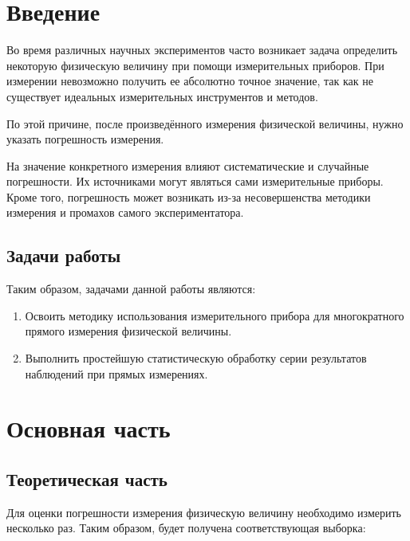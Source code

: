 

\section{Введение}
Во время различных научных экспериментов часто возникает задача определить некоторую физическую величину при помощи измерительных приборов. При измерении  невозможно получить ее абсолютно точное значение, так как не существует идеальных измерительных инструментов и методов.

По этой причине, после произведённого измерения физической величины, нужно указать погрешность измерения.

На значение конкретного измерения влияют систематические и случайные погрешности. Их источниками могут являться сами измерительные приборы. Кроме того, погрешность может возникать из-за несовершенства методики измерения и промахов самого экспериментатора. 


\subsection{Задачи работы}

Таким образом, задачами данной работы являются:
\begin{enumerate}
    \item Освоить методику использования измерительного прибора для
многократного прямого измерения физической величины.
    \item Выполнить простейшую статистическую обработку серии
результатов наблюдений при прямых измерениях.

\end{enumerate}




\section{Основная часть}

\subsection{Теоретическая часть}
Для оценки погрешности измерения физическую величину необходимо измерить несколько раз. Таким образом, будет получена соответствующая выборка:


